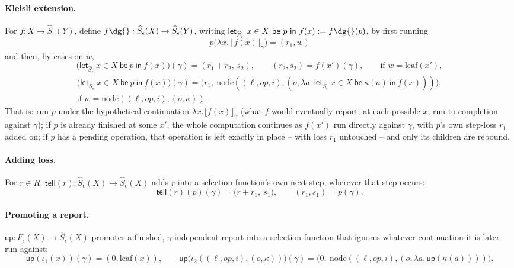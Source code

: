 \documentclass[11pt]{article}
\theoremstyle{plain}
\newcommand{\Fm}[1]{F_{#1}}
\newcommand{\Sm}[1]{\widehat{S}_{#1}}
\newcommand{\eps}{\epsilon}
\newcommand{\op}{\mathit{op}}
\newcommand{\tell}{\mathsf{tell}}
\newcommand{\up}{\mathsf{up}}
\newcommand{\rpt}[2]{\lfloor #1\rfloor_{#2}}
\begin{document}
\paragraph{Kleisli extension.} For $f:X\to\Sm\eps(Y)$, define
$f\dg{}:\Sm\eps(X)\to\Sm\eps(Y)$, writing $\mathsf{let}_{\Sm\eps}\ x\in X\ \mathsf{be}\ p\
\mathsf{in}\ f(x) := f\dg{}(p)$, by first running
\[
  p\big(\lambda x.\,\rpt{f(x)}{\gamma}\big) = (r_1,w)
\]
and then, by cases on $w$,
\[
  \big(\mathsf{let}_{\Sm\eps}\ x\in X\ \mathsf{be}\ p\ \mathsf{in}\ f(x)\big)(\gamma) = (r_1+r_2,\,s_2), \qquad (r_2,s_2)=f(x')(\gamma), \qquad \text{if } w=\mathrm{leaf}(x'),
\]
\begin{multline*}
  \big(\mathsf{let}_{\Sm\eps}\ x\in X\ \mathsf{be}\ p\ \mathsf{in}\ f(x)\big)(\gamma) = \big(r_1,\ \mathrm{node}((\ell,\op,i),(o,\lambda a.\ \mathsf{let}_{\Sm\eps}\ x\in X\ \mathsf{be}\ \kappa(a)\ \mathsf{in}\ f(x)))\big), \\
  \text{if } w=\mathrm{node}((\ell,\op,i),(o,\kappa)).
\end{multline*}
That is: run $p$ under the hypothetical continuation $\lambda x.\rpt{f(x)}{\gamma}$ (what
$f$ would eventually report, at each possible $x$, run to completion against $\gamma$); if
$p$ is already finished at some $x'$, the whole computation continues as $f(x')$ run
directly against $\gamma$, with $p$'s own step-loss $r_1$ added on; if $p$ has a pending
operation, that operation is left exactly in place -- with loss $r_1$ untouched -- and only
its children are rebound.

\paragraph{Adding loss.} For $r\in R$, $\tell(r):\Sm\eps(X)\to\Sm\eps(X)$ adds $r$ into a
selection function's own next step, wherever that step occurs:
\[
  \tell(r)(p)(\gamma) = \big(r+r_1,\ s_1\big), \qquad (r_1,s_1) = p(\gamma).
\]

\paragraph{Promoting a report.} $\up:\Fm\eps(X)\to\Sm\eps(X)$ promotes a finished,
$\gamma$-independent report into a selection function that ignores whatever continuation it
is later run against:
\[
  \up(\iota_1(x))(\gamma) = (0,\mathrm{leaf}(x)), \qquad
  \up\big(\iota_2((\ell,\op,i),(o,\kappa))\big)(\gamma) = \big(0,\ \mathrm{node}((\ell,\op,i),(o,\lambda a.\,\up(\kappa(a))))\big).
\]
\end{document}
